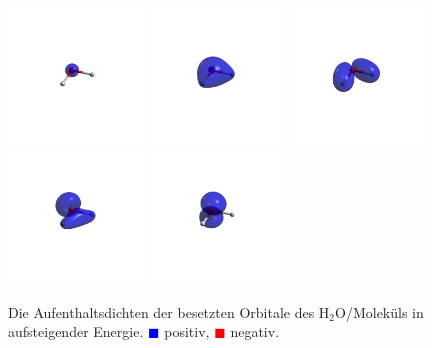 \begin{figure}[H]
    \centering
    \includegraphics[trim=1200 1200 1200 1200, clip, width=0.32\textwidth]{res/H2O/h2o_d0.png}
    \includegraphics[trim=1200 1200 1200 1200, clip, width=0.32\textwidth]{res/H2O/h2o_d1.png}
    \includegraphics[trim=1200 1200 1200 1200, clip, width=0.32\textwidth]{res/H2O/h2o_d2.png}\\
    \includegraphics[trim=1200 1200 1200 1200, clip, width=0.32\textwidth]{res/H2O/h2o_d3.png}
    \includegraphics[trim=1200 1200 1200 1200, clip, width=0.32\textwidth]{res/H2O/h2o_d4.png}
    \caption{Die Aufenthaltsdichten der besetzten Orbitale des H$_2$O\-/Moleküls
    in aufsteigender Energie.
    \textcolor{blue}{$\blacksquare$} positiv,
    \textcolor{red}{$\blacksquare$} negativ.}\label{h2o_densities}
\end{figure}